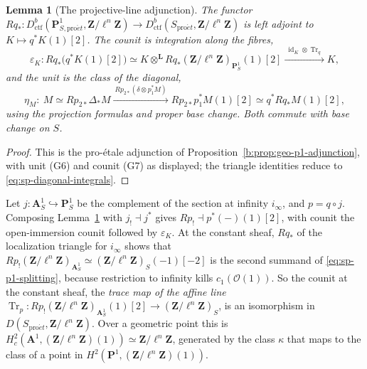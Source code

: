 \documentclass[11pt,a4paper]{article}
\numberwithin{equation}{section}
\newtheorem{lemma}[theorem]{Lemma}
\theoremstyle{definition}
\theoremstyle{remark}
\newcommand{\proet}{\mathrm{pro}\acute{e}t}
\newcommand{\Dctf}{D^b_{\mathrm{ctf}}}
\begin{document}
\begin{lemma}[The projective-line adjunction]\label{lem:sp-p1}
The functor
$Rq_*\colon\Dctf(\mathbf P^1_{S,\proet},\mathbf Z/\ell^n\mathbf Z)\to
\Dctf(S_{\proet},\mathbf Z/\ell^n\mathbf Z)$ is left adjoint to $K\mapsto q^{*}K(1)[2]$. The
counit is integration along the fibres,
\[
 \varepsilon_K:Rq_*\bigl(q^{*}K(1)[2]\bigr)
   \simeq K\otimes^{\mathbf L} Rq_*(\mathbf Z/\ell^n\mathbf Z)_{\mathbf P^1_S}(1)[2]
   \xrightarrow{\ \operatorname{id}_K\otimes\operatorname{Tr}_q\ } K,
\]
and the unit is the class of the diagonal,
\[
 \eta_M:\ M\simeq Rp_{2*}\Delta_*M
  \xrightarrow{\ Rp_{2*}(\delta\otimes p_1^*M)\ } Rp_{2*}p_{1}^{*}M(1)[2]
  \simeq q^{*}Rq_*M(1)[2],
\]
using the projection formulas and proper base change. Both commute with
base change on $S$.
\end{lemma}
\begin{proof}
This is the pro-\'etale adjunction of
Proposition~\ref{b:prop:geo-p1-adjunction},
with unit (G6) and counit (G7) as displayed; the triangle identities
reduce to \eqref{eq:sp-diagonal-integrals}.
\end{proof}

Let $j:\mathbf A^1_S\hookrightarrow\mathbf P^1_S$ be the complement of
the section at infinity $i_\infty$, and $p=q\circ j$. Composing
Lemma~\ref{lem:sp-p1} with $j_!\dashv j^*$ gives
$Rp_!\dashv p^*(-)(1)[2]$, with counit the open-immersion counit
followed by $\varepsilon_K$. At the constant sheaf, $Rq_*$ of the
localization triangle for $i_\infty$ shows that
$Rp_!(\mathbf Z/\ell^n\mathbf Z)_{\mathbf A^1_S}\simeq
(\mathbf Z/\ell^n\mathbf Z)_S(-1)[-2]$ is the second summand of
\eqref{eq:sp-p1-splitting}, because restriction to infinity kills
$c_1(\mathcal O(1))$. So the counit at the constant sheaf, the
\emph{trace map of the affine line}
$\operatorname{Tr}_p:Rp_!(\mathbf Z/\ell^n\mathbf Z)_{\mathbf A^1_S}(1)[2]
\to(\mathbf Z/\ell^n\mathbf Z)_S$, is an isomorphism in
$D(S_{\proet},\mathbf Z/\ell^n\mathbf Z)$. Over a geometric
point this is $H^2_c(\mathbf A^1,(\mathbf Z/\ell^n\mathbf Z)(1))\simeq
\mathbf Z/\ell^n\mathbf Z$, generated by the class $\kappa$ that maps to
the class of a point in $H^2(\mathbf P^1,(\mathbf Z/\ell^n\mathbf Z)(1))$.
\end{document}
